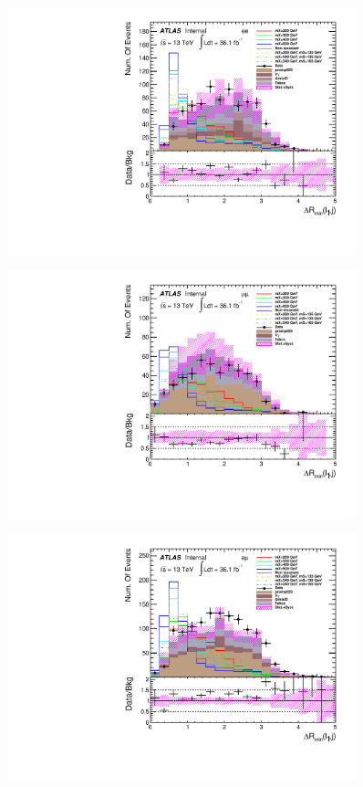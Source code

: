 \begin{figure}[h]
\begin{minipage}[t]{0.33\linewidth}
 \centering
 \includegraphics[width=0.9\textwidth,angle=-90]{fig/dataMC_low_Njet_CR/mindR_l1j_ee.pdf}\label{fig:dataMC_low_Njet_CR:mindRl1j_ee.pdf}
 \end{minipage}
 \begin{minipage}[t]{0.33\linewidth}
 \centering
 \includegraphics[width=0.9\textwidth,angle=-90]{fig/dataMC_low_Njet_CR/mindR_l1j_mumu.pdf}\label{fig:dataMC_low_Njet_CR:mindRl1j_mumu.pdf}
 \end{minipage}
 \begin{minipage}[t]{0.33\linewidth}
 \centering
 \includegraphics[width=0.9\textwidth,angle=-90]{fig/dataMC_low_Njet_CR/mindR_l1j_emu.pdf}\label{fig:dataMC_low_Njet_CR:mindRl1j_emu.pdf}

\end{minipage}
\end{figure}
